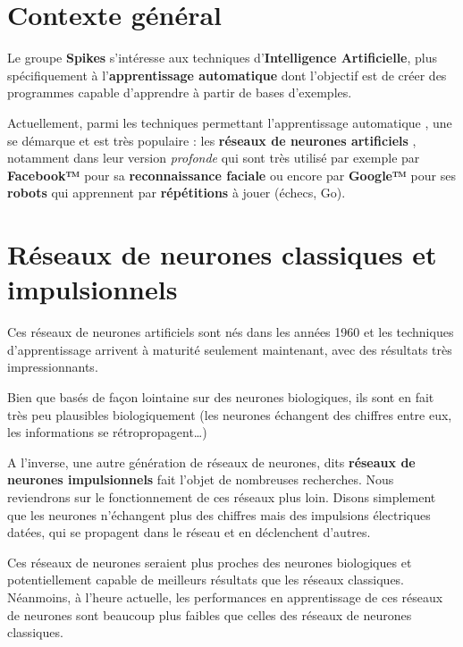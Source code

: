 
\hypertarget{contexte-guxe9nuxe9ral}{%
\section{Contexte général}\label{contexte-guxe9nuxe9ral}}

Le groupe \textbf{Spikes} s'intéresse aux techniques
d'\textbf{Intelligence Artificielle}, plus spécifiquement à
l'\textbf{apprentissage automatique} dont l'objectif est de créer des
programmes capable d'apprendre à partir de bases d'exemples.

Actuellement, parmi les techniques permettant l'apprentissage
automatique , une se démarque et est très populaire : les
\textbf{réseaux de neurones artificiels} , notamment dans leur version
\emph{profonde} qui sont très utilisé par exemple par \textbf{Facebook™}
pour sa \textbf{reconnaissance faciale} ou encore par \textbf{Google™}
pour ses \textbf{robots} qui apprennent par \textbf{répétitions} à jouer
(échecs, Go).

\hypertarget{ruxe9seaux-de-neurones-classiques-et-impulsionnels}{%
\section{Réseaux de neurones classiques et
impulsionnels}\label{ruxe9seaux-de-neurones-classiques-et-impulsionnels}}

Ces réseaux de neurones artificiels sont nés dans les années 1960 et les
techniques d'apprentissage arrivent à maturité seulement maintenant,
avec des résultats très impressionnants.

Bien que basés de façon lointaine sur des neurones biologiques, ils sont
en fait très peu plausibles biologiquement (les neurones échangent des
chiffres entre eux, les informations se rétropropagent\ldots{})

A l'inverse, une autre génération de réseaux de neurones, dits
\textbf{réseaux de neurones impulsionnels} fait l'objet de nombreuses
recherches. Nous reviendrons sur le fonctionnement de ces réseaux plus
loin. Disons simplement que les neurones n'échangent plus des chiffres
mais des impulsions électriques datées, qui se propagent dans le réseau
et en déclenchent d'autres.

Ces réseaux de neurones seraient plus proches des neurones biologiques
et potentiellement capable de meilleurs résultats que les réseaux
classiques. Néanmoins, à l'heure actuelle, les performances en
apprentissage de ces réseaux de neurones sont beaucoup plus faibles que
celles des réseaux de neurones classiques.

